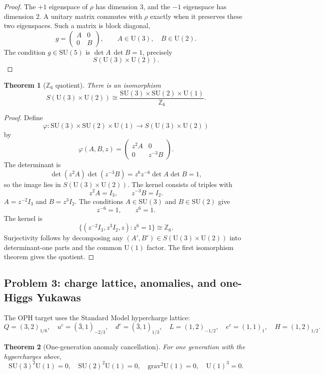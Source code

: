 \documentclass[11pt]{article}
\newtheorem{theorem}{Theorem}[section]
\theoremstyle{remark}
\theoremstyle{plain}
\newcommand{\SU}{\mathrm{SU}}
\newcommand{\U}{\mathrm{U}}
\newcommand{\Z}{\mathbb Z}
\begin{document}
\begin{proof}
The \(+1\) eigenspace of \(\rho\) has dimension \(3\), and the \(-1\) eigenspace has dimension
\(2\). A unitary matrix commutes with \(\rho\) exactly when it preserves these two eigenspaces.
Such a matrix is block diagonal,
\[
g=\begin{pmatrix}A&0\\0&B\end{pmatrix},
\qquad
A\in\U(3),\quad B\in\U(2).
\]
The condition \(g\in\SU(5)\) is \(\det A\,\det B=1\), precisely
\[
S(\U(3)\times\U(2)).
\]
\end{proof}

\begin{theorem}[\(\Z_6\) quotient]
There is an isomorphism
\[
S(\U(3)\times\U(2))
\cong
\frac{\SU(3)\times\SU(2)\times\U(1)}{\Z_6}.
\]
\end{theorem}

\begin{proof}
Define
\[
\varphi:\SU(3)\times\SU(2)\times\U(1)\to S(\U(3)\times\U(2))
\]
by
\[
\varphi(A,B,z)=
\begin{pmatrix}
z^2 A&0\\
0&z^{-3}B
\end{pmatrix}.
\]
The determinant is
\[
\det(z^2A)\det(z^{-3}B)=z^6z^{-6}\det A\det B=1,
\]
so the image lies in \(S(\U(3)\times\U(2))\). The kernel consists of triples with
\[
z^2A=I_3,\qquad z^{-3}B=I_2.
\]
\(A=z^{-2}I_3\) and \(B=z^3I_2\). The conditions \(A\in\SU(3)\) and \(B\in\SU(2)\) give
\[
z^{-6}=1,\qquad z^6=1.
\]
The kernel is
\[
\{(z^{-2}I_3,z^3I_2,z):z^6=1\}\cong\Z_6.
\]
Surjectivity follows by decomposing any \((A',B')\in S(\U(3)\times\U(2))\) into determinant-one
parts and the common \(\U(1)\) factor. The first isomorphism theorem gives the quotient.
\end{proof}

\subsection{Problem 3: charge lattice, anomalies, and one-Higgs Yukawas}

The OPH target uses the Standard Model hypercharge lattice:
\[
Q=(3,2)_{1/6},\quad
u^c=(\bar3,1)_{-2/3},\quad
d^c=(\bar3,1)_{1/3},\quad
L=(1,2)_{-1/2},\quad
e^c=(1,1)_1,\quad
H=(1,2)_{1/2}.
\]

\begin{theorem}[One-generation anomaly cancellation]
For one generation with the hypercharges above,
\[
\SU(3)^2\U(1)=0,\quad
\SU(2)^2\U(1)=0,\quad
\mathrm{grav}^2\U(1)=0,\quad
\U(1)^3=0.
\]
\end{theorem}
\end{document}
